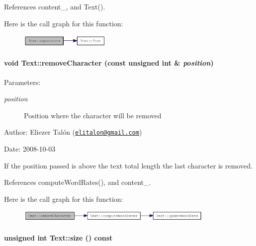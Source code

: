References content\_\-, and Text().

Here is the call graph for this function:\nopagebreak
\begin{figure}[H]
\begin{center}
\leavevmode
\includegraphics[width=124pt]{class_text_c8887fb224e0402448ede4f3b9f7452d_cgraph}
\end{center}
\end{figure}
\hypertarget{class_text_e04500eeada2a4a3bb00554b32263c52}{
\paragraph[{removeCharacter}]{\setlength{\rightskip}{0pt plus 5cm}void Text::removeCharacter (const unsigned int \& {\em position})}\hfill}
\label{class_text_e04500eeada2a4a3bb00554b32263c52}


\begin{Desc}
\item[Parameters:]
\begin{description}
\item[{\em position}]Position where the character will be removed\end{description}
\end{Desc}
\begin{Desc}
\item[Author:]Eliezer Talón (\href{mailto:elitalon@gmail.com}{\tt elitalon@gmail.com}) \end{Desc}
\begin{Desc}
\item[Date:]2008-10-03\end{Desc}
If the position passed is above the text total length the last character is removed. 

References computeWordRates(), and content\_\-.

Here is the call graph for this function:\nopagebreak
\begin{figure}[H]
\begin{center}
\leavevmode
\includegraphics[width=269pt]{class_text_e04500eeada2a4a3bb00554b32263c52_cgraph}
\end{center}
\end{figure}
\hypertarget{class_text_b66729ba84c2698ed888f641b3838a8b}{
\paragraph[{size}]{\setlength{\rightskip}{0pt plus 5cm}unsigned int Text::size () const}\hfill}
\label{class_text_b66729ba84c2698ed888f641b3838a8b}


